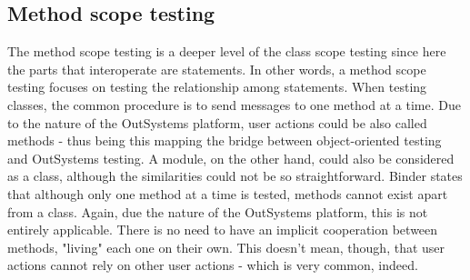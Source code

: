 \documentclass{sigchi}
\begin{document}
\subsection{Method scope testing}
The method scope testing is a deeper level of the class scope testing since here the parts that interoperate are statements. In other words, a method scope testing focuses on testing the relationship among statements. When testing classes, the common procedure is to send messages to one method at a time. Due to the nature of the OutSystems platform, user actions could be also called methods - thus being this mapping the bridge between object-oriented testing and OutSystems testing. A module, on the other hand, could also be considered as a class, although the similarities could not be so straightforward.
Binder states that although only one method at a time is tested, methods cannot exist apart from a class. Again, due the nature of the OutSystems platform, this is not entirely applicable. There is no need to have an implicit cooperation between methods, "living" each one on their own. This doesn't mean, though, that user actions cannot rely on other user actions - which is very common, indeed.
\end{document}
